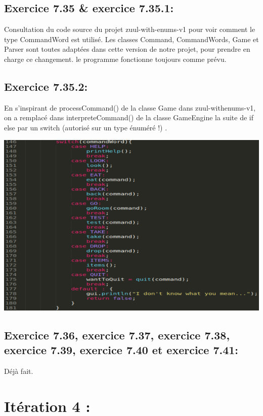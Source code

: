 \documentclass[french,10pt,a4paper]{report}
\begin{document}
\subsection{\textcolor{bb}{Exercice 7.35 \& exercice 7.35.1:}}
Consultation du code source du projet zuul-with-enums-v1 pour voir comment  le type CommandWord est utilisé. Les classes Command, CommandWords, Game et Parser sont toutes  adaptées dans cette version de notre projet, pour prendre en charge ce changement. le programme fonctionne toujours comme prévu.

\subsection{\textcolor{bb}{Exercice 7.35.2:}}
En s'inspirant de processCommand() de la classe Game dans zuul-withenums-v1, on a remplacé dans interpreteCommand() de la classe GameEngine la suite de if else par un switch (autorisé sur un type énuméré !) .
\begin{center}
	\includegraphics[scale=0.4]{captures/it3_10.png}
\end{center}

\subsection{\textcolor{bb}{Exercice 7.36, exercice 7.37, exercice 7.38, exercice 7.39, exercice 7.40 et exercice 7.41:}}
Déjà fait.



\section{\textcolor{rr}{Itération 4 :}}
\end{document}
